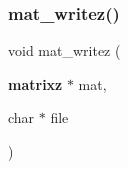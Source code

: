 \mbox{\label{mat_lib_8h_a537d08e09d1209de15ab8fe9952e0c53}} 
\subsubsection{mat\+\_\+writez()}
{\footnotesize\ttfamily void mat\+\_\+writez (\begin{DoxyParamCaption}\item[{\textbf{ matrixz} $\ast$}]{mat,  }\item[{char $\ast$}]{file }\end{DoxyParamCaption})}

